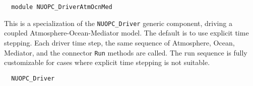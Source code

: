  
\setlength{\parskip}{0pt}
\setlength{\parindent}{0pt}
\setlength{\baselineskip}{11pt}
 
\def\bv{\begin{verbatim}}
\def\ev{\end{verbatim}}
\def\be{\begin{equation}}
\def\ee{\end{equation}}
\def\bea{\begin{eqnarray}}
\def\eea{\end{eqnarray}}
\def\bi{\begin{itemize}}
\def\ei{\end{itemize}}
\def\bn{\begin{enumerate}}
\def\en{\end{enumerate}}
\def\bd{\begin{description}}
\def\ed{\end{description}}
\def\({\left (}
\def\){\right )}
\def\[{\left [}
\def\]{\right ]}
\def\<{\left  \langle}
\def\>{\right \rangle}
\def\cI{{\cal I}}
\def\diag{\mathop{\rm diag}}
\def\tr{\mathop{\rm tr}}


\begin{verbatim}  module NUOPC_DriverAtmOcnMed
\end{verbatim}

This is a specialization of the {\tt NUOPC\_Driver} generic component, driving a coupled Atmosphere-Ocean-Mediator model. The default is to use explicit time stepping. Each driver time step, the same sequence of Atmosphere, Ocean, Mediator, and the connector {\tt Run} methods are called. The run sequence is fully customizable for cases where explicit time stepping is not suitable.

\begin{verbatim}  NUOPC_Driver
\end{verbatim}

